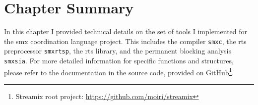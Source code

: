 \section{Chapter Summary}
\label{sect_tool_summary}
In this chapter I provided technical details on the set of tools I implemented for the \gls*{smx} coordination language project.
This includes the compiler \texttt{smxc}, the \gls{rts} preprocessor \texttt{smxrtsp}, the \gls{rts} library, and the permanent blocking analysis \texttt{smxsia}.
For more detailed information for specific functions and structures, please refer to the documentation in the source code, provided on GitHub\footnote{Streamix root project: \url{https://github.com/moiri/streamix}}.
